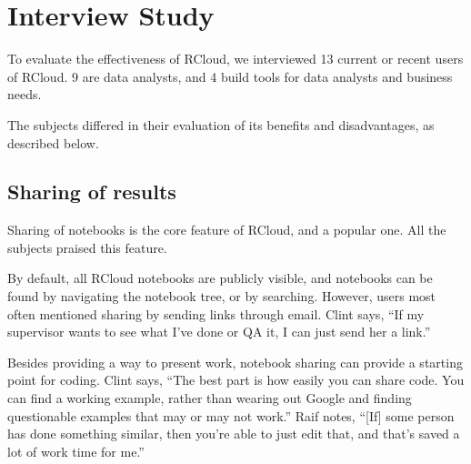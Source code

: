 \section{Interview Study\label{sec:interviews}}

To evaluate the effectiveness of RCloud, we interviewed 13 current or
recent users of RCloud. 9 are data analysts, and 4 build tools for data
analysts and business needs.

The subjects differed in their evaluation of its benefits and disadvantages,
as described below.


\subsection{Sharing of results}
Sharing of notebooks is the core feature of RCloud, and a popular one. All
the subjects praised this feature.


By default, all RCloud notebooks are publicly visible, and notebooks can be
found by navigating the notebook tree, or by searching. However, users most
often mentioned sharing by sending links through email. Clint says,
``If my supervisor wants to see what I've done or QA it, I can just send her a link.''

Besides providing a way to present work, notebook sharing can provide a
starting point for coding. Clint says, ``The best part is how easily you can
share code. You can find a working example, rather than wearing
out Google and finding questionable examples that may or may not work.'' Raif
notes, ``[If] some person has done something similar, then you're able to just
edit that, and that's saved a lot of work time for me.''


